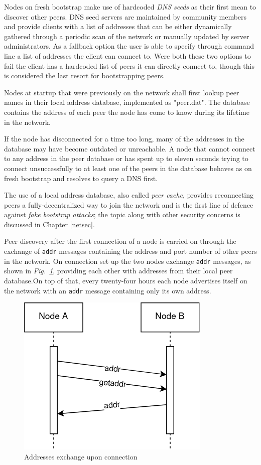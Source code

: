 \documentclass[12pt, letterpaper, twoside]{article}
\begin{document}
Nodes on fresh bootstrap make use of hardcoded \emph{DNS seeds} as their first mean to discover other peers. DNS seed servers are maintained by community members and provide clients with a list of addresses that can be either dynamically gathered through a periodic scan of the network or manually updated by server administrators. As a fallback option the user is able to specify through command line a list of addresses the client can connect to. Were both these two options to fail the client has a hardcoded list of peers it can directly connect to, though this is considered the last resort for bootstrapping peers.

Nodes at startup that were previously on the network shall first lookup peer names in their local address database, implemented as "peer.dat". The database contains the address of each peer the node has come to know during its lifetime in the network.

If the node has disconnected for a time too long, many of the addresses in the database may have become outdated or unreachable. A node that cannot connect to any address in the peer database or has spent up to eleven seconds trying to connect unsuccessfully to at least one of the peers in the database behaves as on fresh bootstrap and resolves to query a DNS first.

The use of a local address database, also called \emph{peer cache}, provides reconnecting peers a fully-decentralized way to join the network and is the first line of defence against \emph{fake bootstrap attacks}; the topic along with other security concerns is discussed in Chapter \ref{netsec}.

Peer discovery after the first connection of a node is carried on through the exchange of \texttt{addr} messages containing the address and port number of other peers in the network. On connection set up the two nodes exchange \texttt{addr} messages, as shown in \emph{Fig.~\ref{fig:addr}}, providing each other with addresses from their local peer database.On top of that, every twenty-four hours each node advertises itself on the network with an \texttt{addr} message containing only its own address.

\begin{figure}[h]
	\includegraphics[width=.45\textwidth]{pict/BTCaddr.png}
	\centering
	\caption{Addresses exchange upon connection}
	\label{fig:addr}
\end{figure}
\end{document}
